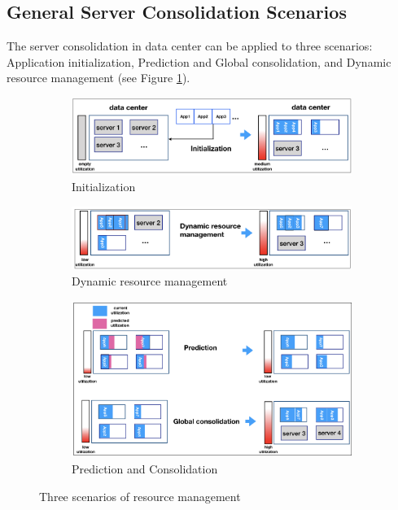 \subsection{General Server Consolidation Scenarios}

The server consolidation in data center can be applied to three \cite{Svard:2015ic, Mishra:2012kx} scenarios: Application initialization, Prediction and Global consolidation, and Dynamic resource management (see Figure \ref{fig:management}). 

\begin{figure}
	\centering
	\begin{subfigure}[b]{0.9\textwidth}
		\includegraphics[width=\textwidth]{pics/initialization.png}
		\caption{Initialization}
	\end{subfigure}
	\begin{subfigure}[b]{0.9\textwidth}
		\includegraphics[width=\textwidth]{pics/dynamic_resource.png}
	\caption{Dynamic resource management}
	\end{subfigure}
	\begin{subfigure}[b]{0.9\textwidth}
		\includegraphics[width=\textwidth]{pics/predict_consolidate.png}
	\caption{Prediction and Consolidation}
	\end{subfigure}
	\caption{Three scenarios of resource management}
	\label{fig:management}
\end{figure}

